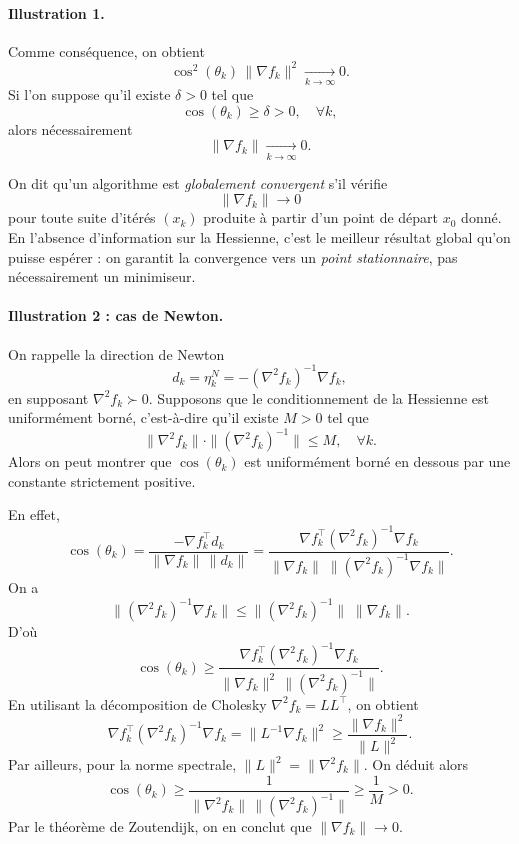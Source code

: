 \paragraph{Illustration 1.}
Comme conséquence, on obtient
\[
    \cos^2(\theta_k)\,\|\nabla f_k\|^2 \xrightarrow[k\to\infty]{} 0.
\]
Si l’on suppose qu’il existe $\delta>0$ tel que
\[
    \cos(\theta_k) \ge \delta > 0, \quad \forall k,
\]
alors nécessairement
\[
    \|\nabla f_k\| \xrightarrow[k\to\infty]{} 0.
\]

\begin{definition}
On dit qu’un algorithme est \emph{globalement convergent} s’il vérifie
\[
    \|\nabla f_k\| \to 0
\]
pour toute suite d’itérés $(x_k)$ produite à partir d’un point de départ $x_0$ donné.
En l’absence d’information sur la Hessienne, c’est le meilleur résultat global
qu’on puisse espérer : on garantit la convergence vers un \emph{point stationnaire},
pas nécessairement un minimiseur.
\end{definition}

\paragraph{Illustration 2 : cas de Newton.}

On rappelle la direction de Newton
\[
    d_k = \eta_k^N = -(\nabla^2 f_k)^{-1}\nabla f_k,
\]
en supposant $\nabla^2 f_k \succ 0$. Supposons que le conditionnement de la
Hessienne est uniformément borné, c’est-à-dire qu’il existe $M>0$ tel que
\[
    \|\nabla^2 f_k\|\cdot\|(\nabla^2 f_k)^{-1}\| \le M, \quad \forall k.
\]
Alors on peut montrer que $\cos(\theta_k)$ est uniformément borné en dessous
par une constante strictement positive.

En effet,
\[
    \cos(\theta_k)
    = \frac{-\nabla f_k^\top d_k}{\|\nabla f_k\|\,\|d_k\|}
    = \frac{\nabla f_k^\top (\nabla^2 f_k)^{-1} \nabla f_k}
           {\|\nabla f_k\|\;\|(\nabla^2 f_k)^{-1}\nabla f_k\|}.
\]
On a
\[
    \|(\nabla^2 f_k)^{-1}\nabla f_k\|
    \le \|(\nabla^2 f_k)^{-1}\|\;\|\nabla f_k\|.
\]
D’où
\[
    \cos(\theta_k)
    \ge \frac{\nabla f_k^\top (\nabla^2 f_k)^{-1} \nabla f_k}
              {\|\nabla f_k\|^2 \,\|(\nabla^2 f_k)^{-1}\|}.
\]
En utilisant la décomposition de Cholesky $\nabla^2 f_k = LL^\top$,
on obtient
\[
    \nabla f_k^\top (\nabla^2 f_k)^{-1} \nabla f_k
    = \|L^{-1}\nabla f_k\|^2
    \ge \frac{\|\nabla f_k\|^2}{\|L\|^2}.
\]
Par ailleurs, pour la norme spectrale, $\|L\|^2 = \|\nabla^2 f_k\|$.
On déduit alors
\[
    \cos(\theta_k)
    \ge \frac{1}{\|\nabla^2 f_k\|\,\|(\nabla^2 f_k)^{-1}\|}
    \ge \frac{1}{M} > 0.
\]
Par le théorème de Zoutendijk, on en conclut que $\|\nabla f_k\| \to 0$.


